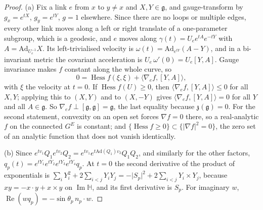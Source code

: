\documentclass[11pt,a4paper]{amsart}
\theoremstyle{definition}
\theoremstyle{remark}
\numberwithin{equation}{section}
\DeclareMathOperator{\Hess}{Hess}    %
\newcommand{\ip}[2]{\langle #1,#2\rangle}  %
\newcommand{\abs}[1]{\lvert #1\rvert}      %
\begin{document}
\begin{proof}
(a) Fix a link $e$ from $x$ to $y\ne x$ and $X,Y\in\mathfrak g$, and gauge-transform by $g_x=e^{tX}$, $g_y=e^{tY}$, $g=1$ elsewhere. Since there are no loops or multiple edges, every other link moves along a left or right translate of a one-parameter subgroup, which is a geodesic, and $e$ moves along $\gamma(t)=U_ee^{tA}e^{-tY}$ with $A=\mathrm{Ad}_{U_e^{-1}}X$. Its left-trivialised velocity is $\omega(t)=\mathrm{Ad}_{e^{tY}}(A-Y)$, and in a bi-invariant metric the covariant acceleration is $U_e\,\omega'(0)=U_e[Y,A]$. Gauge invariance makes $f$ constant along the whole curve, so
\[
0=\Hess f(\xi,\xi)+\ip{\nabla_ef}{[Y,A]},
\]
with $\xi$ the velocity at $t=0$. If $\Hess f(U)\ge0$, then $\ip{\nabla_ef}{[Y,A]}\le0$ for all $X,Y$; applying this to $(X,Y)$ and to $(X,-Y)$ gives $\ip{\nabla_ef}{[Y,A]}=0$ for all $Y$ and all $A\in\mathfrak g$. So $\nabla_ef\perp[\mathfrak g,\mathfrak g]=\mathfrak g$, the last equality because $\mathfrak z(\mathfrak g)=0$. For the second statement, convexity on an open set forces $\nabla f=0$ there, so a real-analytic $f$ on the connected $G^E$ is constant; and $\{\Hess f\ge0\}\subset\{\abs{\nabla f}^2=0\}$, the zero set of an analytic function that does not vanish identically.

(b) Since $e^{tv_1}Q_1e^{tv_2}Q_2=e^{tv_1}e^{t\mathrm{Ad}(Q_1)v_2}Q_1Q_2$, and similarly for the other factors, $q_p(t)=e^{tY_1}e^{tY_2}e^{tY_3}e^{tY_4}q_p$. At $t=0$ the second derivative of the product of exponentials is $\sum_iY_i^2+2\sum_{i<j}Y_iY_j=-\abs{S_p}^2+2\sum_{i<j}Y_i\times Y_j$, because $xy=-x\cdot y+x\times y$ on $\operatorname{Im}\mathbb H$, and its first derivative is $S_p$. For imaginary $w$, $\operatorname{Re}(wq_p)=-\sin\theta_p\,n_p\cdot w$.


\end{proof}
\end{document}
